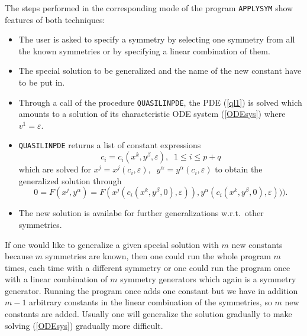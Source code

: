 The steps performed in the corresponding mode of the
program {\tt APPLYSYM} show features of both techniques:
\begin{itemize}
\item The user is asked to specify a symmetry by selecting one symmetry
from all the known symmetries or by specifying a linear combination of them.
\item The special solution to be generalized and the name of the new
constant have to be put in.
\item Through a call of the procedure {\tt QUASILINPDE}, the PDE (\ref{ql1})
is solved which amounts to a solution of its characteristic ODE system
(\ref{ODEsys}) where $v^1=\varepsilon$.
\item {\tt QUASILINPDE} returns a list of constant expressions
\begin{equation}
c_i = c_i(x^k, y^\beta, \varepsilon),\;\;1\leq i\leq p+q
\end{equation}
which are solved for
$x^j=x^j(c_i,\varepsilon),\;\; y^\alpha=y^\alpha(c_i,\varepsilon)$
to obtain the generalized solution through
\[ 0 = F(x^j, y^\alpha)
     = F(     x^j(c_i(x^k, y^\beta, 0), \varepsilon)),
         y^\alpha(c_i(x^k, y^\beta, 0), \varepsilon))). \]
\item The new solution is availabe for further generalizations w.r.t.\ other
symmetries.
\end{itemize}
If one would like to generalize a given special solution with $m$ new
constants because $m$ symmetries are known, then one could run the whole
program $m$ times, each time with a different symmetry or one could run the
program once with a linear combination of $m$ symmetry generators which
again is a symmetry generator. Running the program once adds one constant
but we have in addition $m-1$ arbitrary constants in the linear combination
of the symmetries, so $m$ new constants are added.
Usually one will generalize the solution gradually to make solving
(\ref{ODEsys}) gradually more difficult.
